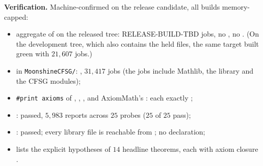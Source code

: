 \begin{status}[title={The release build of v1.1 (Lean v4.35.0-rc3)}]
\textbf{Verification.} Machine-confirmed on the release candidate, all builds memory-capped:
\begin{itemize}
\item aggregate  of  on the released tree: RELEASE-BUILD-TBD jobs, no , no
  . (On the development tree, which also contains the held files, the same target built green with
  $21{,}607$ jobs.)
\item {} in \texttt{MoonshineCFSG/}: , $31{,}417$ jobs (the jobs include
  Mathlib, the library and the CFSG modules);
\item \texttt{\#print axioms} of , , ,
   and AxiomMath's
  : each exactly
  ;
\item {}: passed, $5{,}983$ reports across $25$ probes ($25$ of $25$ pass);
\item {}: passed; every library file is reachable from ; no
   declaration;
\item {} lists the explicit  hypotheses of $14$ headline
  theorems, each with axiom closure .
\end{itemize}


\end{status}
